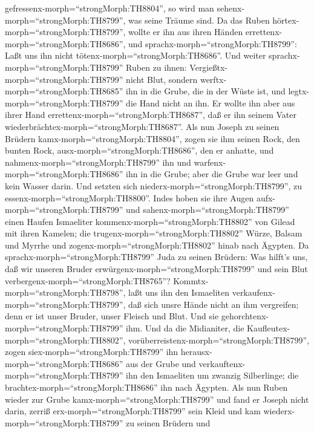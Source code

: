 gefressenx-morph=``strongMorph:TH8804'', so wird man
sehenx-morph=``strongMorph:TH8799'', was seine Träume sind.
 Da das Ruben hörtex-morph=``strongMorph:TH8799'', wollte
er ihn aus ihren Händen errettenx-morph=``strongMorph:TH8686'', und
sprachx-morph=``strongMorph:TH8799'': Laßt uns ihn nicht
tötenx-morph=``strongMorph:TH8686''.  Und weiter
sprachx-morph=``strongMorph:TH8799'' Ruben zu ihnen:
Vergießtx-morph=``strongMorph:TH8799'' nicht Blut, sondern
werftx-morph=``strongMorph:TH8685'' ihn in die Grube, die in der Wüste
ist, und legtx-morph=``strongMorph:TH8799'' die Hand nicht an ihn. Er
wollte ihn aber aus ihrer Hand errettenx-morph=``strongMorph:TH8687'',
daß er ihn seinem Vater wiederbrächtex-morph=``strongMorph:TH8687''.
 Als nun Joseph zu seinen Brüdern
kamx-morph=``strongMorph:TH8804'', zogen sie ihm seinen Rock, den bunten
Rock, ausx-morph=``strongMorph:TH8686'', den er anhatte, 
und nahmenx-morph=``strongMorph:TH8799'' ihn und
warfenx-morph=``strongMorph:TH8686'' ihn in die Grube; aber die Grube
war leer und kein Wasser darin.  Und setzten sich
niederx-morph=``strongMorph:TH8799'', zu
essenx-morph=``strongMorph:TH8800''. Indes hoben sie ihre Augen
aufx-morph=``strongMorph:TH8799'' und
sahenx-morph=``strongMorph:TH8799'' einen Haufen Ismaeliter
kommenx-morph=``strongMorph:TH8802'' von Gilead mit ihren Kamelen; die
trugenx-morph=``strongMorph:TH8802'' Würze, Balsam und Myrrhe und
zogenx-morph=``strongMorph:TH8802'' hinab nach Ägypten.  Da
sprachx-morph=``strongMorph:TH8799'' Juda zu seinen Brüdern: Was hilft's
uns, daß wir unseren Bruder erwürgenx-morph=``strongMorph:TH8799'' und
sein Blut verbergenx-morph=``strongMorph:TH8765''? 
Kommtx-morph=``strongMorph:TH8798'', laßt uns ihn den Ismaeliten
verkaufenx-morph=``strongMorph:TH8799'', daß sich unsre Hände nicht an
ihm vergreifen; denn er ist unser Bruder, unser Fleisch und Blut. Und
sie gehorchtenx-morph=``strongMorph:TH8799'' ihm.  Und da
die Midianiter, die Kaufleutex-morph=``strongMorph:TH8802'',
vorüberreistenx-morph=``strongMorph:TH8799'', zogen
siex-morph=``strongMorph:TH8799'' ihn
herausx-morph=``strongMorph:TH8686'' aus der Grube und
verkauftenx-morph=``strongMorph:TH8799'' ihn den Ismaeliten um zwanzig
Silberlinge; die brachtex-morph=``strongMorph:TH8686'' ihn nach Ägypten.
 Als nun Ruben wieder zur Grube
kamx-morph=``strongMorph:TH8799'' und fand er Joseph nicht darin, zerriß
erx-morph=``strongMorph:TH8799'' sein Kleid  und kam
wiederx-morph=``strongMorph:TH8799'' zu seinen Brüdern und
